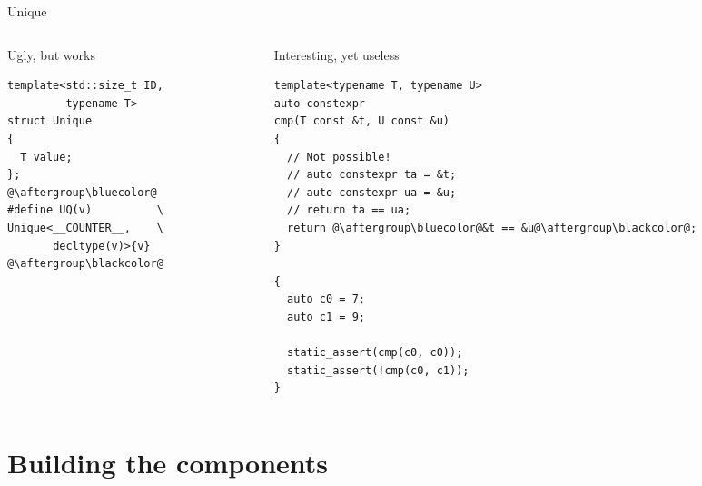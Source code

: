 \documentclass[xcolor=dvipsnames]{beamer}
\begin{document}
\begin{frame}[fragile]{Unique}
\begin{columns}[T] %
    \begin{column}{0.44\textwidth}
  {\color{gray}Ugly, but works}
        \begin{lstlisting}
template<std::size_t ID,
         typename T>
struct Unique
{
  T value;
};
@\aftergroup\bluecolor@
#define UQ(v)          \
Unique<__COUNTER__,    \
       decltype(v)>{v}
@\aftergroup\blackcolor@
  \end{lstlisting}
    \end{column}%
    \hfill%
    \begin{column}{0.56\textwidth}
      {\color{gray}Interesting, yet useless}
\begin{lstlisting}
template<typename T, typename U>
auto constexpr
cmp(T const &t, U const &u)
{
  // Not possible!
  // auto constexpr ta = &t;
  // auto constexpr ua = &u;
  // return ta == ua;
  return @\aftergroup\bluecolor@&t == &u@\aftergroup\blackcolor@;
}

{
  auto c0 = 7;
  auto c1 = 9;

  static_assert(cmp(c0, c0));
  static_assert(!cmp(c0, c1));
}
\end{lstlisting}
    \end{column}%
  \end{columns}
\end{frame}


\section{Building the components}
\end{document}
